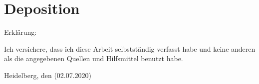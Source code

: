 \chapter{Deposition}
\setlength{\parindent}{0em}

Erkl\"{a}rung:\par
\vspace{3\baselineskip}
Ich versichere, dass ich diese Arbeit selbstst\"{a}ndig verfasst habe und keine
anderen als die angegebenen Quellen und Hilfsmittel benutzt habe.\par

\vspace{5\baselineskip}
Heidelberg, den (02.07.2020)\hspace{3cm}\dotfill
